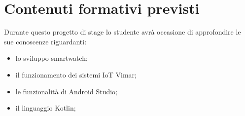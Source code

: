 \section*{Contenuti formativi previsti}
Durante questo progetto di stage lo studente avrà occasione di approfondire le sue conoscenze riguardanti:
\begin{itemize}
    \item lo sviluppo smartwatch;
    \item il funzionamento dei sistemi IoT Vimar;
    \item le funzionalità di Android Studio;
    \item il linguaggio Kotlin; 
\end{itemize}
\newpage